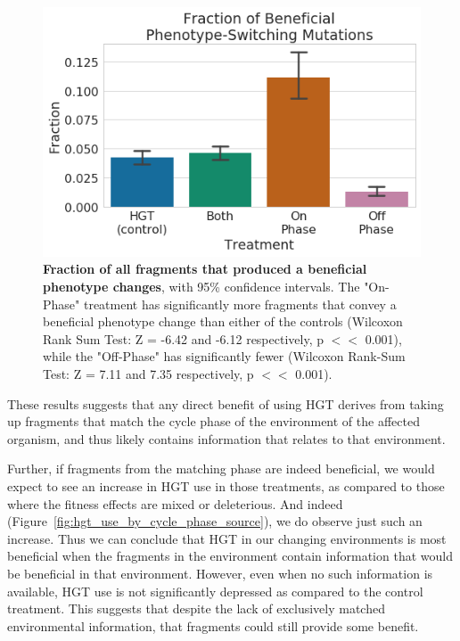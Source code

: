 \documentclass[PhD]{msu-thesis}
\begin{document}
	\begin{figure}[h!]
	\begin{center}
	\includegraphics[width=0.75\columnwidth]{figures/HGT/beneficial_fraction_by_cycle_phase_source.png}
	\caption{\textbf{Fraction of all fragments that produced a beneficial phenotype changes}, with 95\% confidence intervals. The "On-Phase" treatment has significantly more fragments that convey a beneficial phenotype change than either of the controls (Wilcoxon Rank Sum Test: Z = -6.42 and -6.12 respectively, p $<<$ 0.001), while the "Off-Phase" has significantly fewer (Wilcoxon Rank-Sum Test: Z = 7.11 and 7.35 respectively, p $<<$ 0.001).
	}\label{fig:beneficial_fraction_by_cycle_phase_source}
	\end{center}
	\end{figure}

These results suggests that any direct benefit of using HGT derives from taking up fragments that match the cycle phase of the environment of the affected organism, and thus likely contains information that relates to that environment. %

Further, if fragments from the matching phase are indeed beneficial, we would expect to see an increase in HGT use in those treatments, as compared to those where the fitness effects are mixed or deleterious. And indeed (Figure~\ref{fig:hgt_use_by_cycle_phase_source}), we do observe just such an increase. Thus we can conclude that HGT in our
changing environments is most beneficial when the fragments in the environment contain information that would be beneficial in that environment. However, even when no such information is available, HGT use is not significantly depressed as compared to the control treatment. This suggests that despite the lack of exclusively matched environmental information, that fragments could still provide some benefit. 
\end{document}
